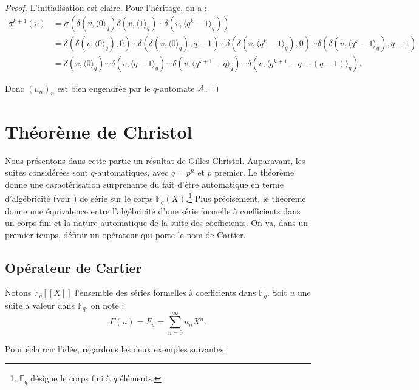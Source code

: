 \documentclass[12pt]{article}
\theoremstyle{plain}
\theoremstyle{definition}
\theoremstyle{remark}
\begin{document}
\begin{proof}
  L'initialisation est claire. Pour l'h\'eritage, on a :
  \begin{displaymath}
  \begin{array}{ll}
    \sigma^{k+1}(v)&=\sigma(\delta(v,\langle{0}\rangle_{q})\delta(v,\langle{1}\rangle_{q})\cdots\delta(v,
    \langle{q^{k}-1}\rangle_{q}))\\&=\delta(\delta(v,\langle{0}\rangle_{q}),0)\cdots\delta(\delta(v,\langle{0}
    \rangle_{q}),q-1)\cdots\delta(\delta(v,\langle{q^{k}-1}\rangle_{q}),0)\cdots\delta(\delta(v,\langle{q^{k}-1}
    \rangle_{q}),q-1)\\&=\delta(v,\langle{0}\rangle_{q})\cdots\delta(v,\langle{q-1}\rangle_{q})\cdots\delta(v
    ,\langle{q^{k+1}-q}\rangle_{q})\cdots\delta(v,\langle{q^{k+1}-q+(q-1)}\rangle_{q}).
  \end{array}
  \end{displaymath}

  Donc $(u_{n})_{n}$ est bien engendr\'ee par le $q$-automate $\cal{A}$.
\end{proof}

\section{Th\'eor\`eme de Christol}
Nous pr\'esentons dans cette partie un r\'esultat de Gilles Christol. Auparavant, les suites consid\'er\'ees sont $q$-automatiques, avec $q=p^{n}$ et $p$ premier. Le th\'eor\`eme donne une caract\'erisation surprenante du fait d'\^etre automatique en terme d'alg\'ebricit\'e (voir \cite{Allouche05}) de s\'erie sur le corps $\mathbb{F}_{q}(X)$.\footnote{$\mathbb{F}_{q}$ d\'esigne le corps fini \`a $q$ \'el\'ements.} Plus pr\'ecis\'ement, le th\'eor\`eme donne une \'equivalence entre l'alg\'ebricit\'e d'une s\'erie formelle \`a coefficients dans un corps fini et la nature automatique de la suite des coefficients. On va, dans un premier temps, d\'efinir un op\'erateur qui porte le nom de Cartier.

\subsection{Op\'erateur de Cartier}

Notons $\mathbb{F}_{q}[[X]]$ l'ensemble des s\'eries formelles \`a coefficients dans $\mathbb{F}_{q}$. Soit $u$ une suite \`a valeur dans $\mathbb{F}_{q}$, on note : $$F(u)=F_{u}=\sum_{n=0}^{\infty}u_{n}X^{n}.$$

Pour \'eclaircir l'id\'ee, regardons les deux exemples suivantes:
\end{document}
